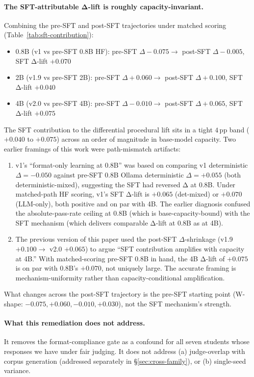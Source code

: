 \documentclass[10pt]{article}
\begin{document}
\paragraph{The SFT-attributable Δ-lift is roughly capacity-invariant.} Combining the pre-SFT and post-SFT trajectories under matched scoring (Table~\ref{tab:sft-contribution}):
\begin{itemize}[leftmargin=*, nosep]
    \item 0.8B (v1 vs pre-SFT 0.8B HF): pre-SFT $\Delta -0.075 \to$ post-SFT $\Delta -0.005$, SFT Δ-lift $\boldsymbol{+0.070}$
    \item 2B (v1.9 vs pre-SFT 2B): pre-SFT $\Delta +0.060 \to$ post-SFT $\Delta +0.100$, SFT Δ-lift $\boldsymbol{+0.040}$
    \item 4B (v2.0 vs pre-SFT 4B): pre-SFT $\Delta -0.010 \to$ post-SFT $\Delta +0.065$, SFT Δ-lift $\boldsymbol{+0.075}$
\end{itemize}
The SFT contribution to the differential procedural lift sits in a tight $4$\,pp band ($+0.040$ to $+0.075$) across an order of magnitude in base-model capacity. Two earlier framings of this work were path-mismatch artifacts:
\begin{enumerate}[leftmargin=*, nosep]
  \item v1's ``format-only learning at 0.8B'' was based on comparing v1 deterministic $\Delta = -0.050$ against pre-SFT 0.8B Ollama deterministic $\Delta = +0.055$ (both deterministic-mixed), suggesting the SFT had reversed Δ at 0.8B. Under matched-path HF scoring, v1's SFT Δ-lift is $+0.065$ (det-mixed) or $+0.070$ (LLM-only), both positive and on par with 4B. The earlier diagnosis confused the absolute-pass-rate ceiling at 0.8B (which is base-capacity-bound) with the SFT mechanism (which delivers comparable Δ-lift at 0.8B as at 4B).
  \item The previous version of this paper used the post-SFT $\Delta$-shrinkage (v1.9 $+0.100 \to$ v2.0 $+0.065$) to argue ``SFT contribution amplifies with capacity at 4B.'' With matched-scoring pre-SFT 0.8B in hand, the 4B Δ-lift of $+0.075$ is on par with 0.8B's $+0.070$, not uniquely large. The accurate framing is mechanism-uniformity rather than capacity-conditional amplification.
\end{enumerate}
What changes across the post-SFT trajectory is the pre-SFT starting point (W-shape: $-0.075, +0.060, -0.010, +0.030$), not the SFT mechanism's strength.

\paragraph{What this remediation does not address.} It removes the format-compliance gate as a confound for all seven students whose responses we have under fair judging. It does not address (a) judge-overlap with corpus generation (addressed separately in \S\ref{sec:cross-family}), or (b) single-seed variance.
\end{document}
